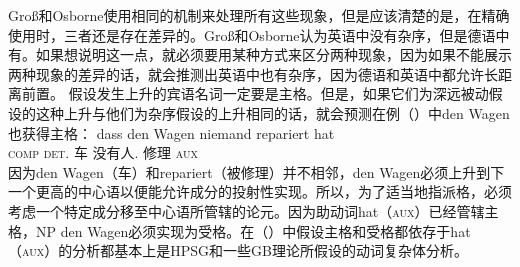 Groß和Osborne使用相同的机制来处理所有这些现象，但是应该清楚的是，在精确使用时，三者还是存在差异的。Groß和Osborne认为英语中没有杂序，但是德语中有。如果想说明这一点，就必须要用某种方式来区分两种现象，因为如果不能展示两种现象的差异的话，就会推测出英语中也有杂序，因为德语和英语中都允许长距离前置。 \citet[]{GO2009a}假设发生上升的宾语名词一定要是主格。但是，如果它们为深远被动假设的这种上升与他们为杂序假设的上升相同的话，就会预测在例（）中den Wagen也获得主格：
\ea
\gll dass den Wagen niemand repariert hat\\
     \textsc{comp} \textsc{det}.\acc{} 车 没有人.\nom{} 修理 \textsc{aux}\\
\z
因为den Wagen（车）和repariert（被修理）并不相邻，den Wagen必须上升到下一个更高的中心语以便能允许成分的投射性实现。所以，为了适当地指派格，必须考虑一个特定成分移至中心语所管辖的论元。因为助动词hat（\textsc{aux}）已经管辖主格，NP den Wagen必须实现为受格。在（）中假设主格和受格都依存于hat（\textsc{aux}）的分析都基本上是HPSG和一些GB理论所假设的动词复杂体分析。

